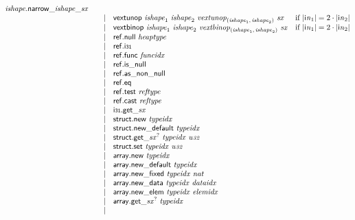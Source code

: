 $$\begin{array}{@{}lrrl@{}l@{}}
{{{{{\mathit{ishape}}.\mathsf{narrow}}{\mathsf{\_}}}{{\mathit{ishape}}}}{\mathsf{\_}}}{{\mathit{sx}}} \\ &&|&
\mathsf{vextunop}~{\mathit{ishape}}_{{1}}~{\mathit{ishape}}_{{2}}~{{\mathit{vextunop}}}_{({\mathit{ishape}}_{{1}},\, {\mathit{ishape}}_{{2}})}~{\mathit{sx}} &\quad
  \mbox{if}~{|{{\mathsf{i}}{{\mathit{n}}}}_{{1}}|} = 2 \cdot {|{{\mathsf{i}}{{\mathit{n}}}}_{{2}}|} \\ &&|&
\mathsf{vextbinop}~{\mathit{ishape}}_{{1}}~{\mathit{ishape}}_{{2}}~{{\mathit{vextbinop}}}_{({\mathit{ishape}}_{{1}},\, {\mathit{ishape}}_{{2}})}~{\mathit{sx}} &\quad
  \mbox{if}~{|{{\mathsf{i}}{{\mathit{n}}}}_{{1}}|} = 2 \cdot {|{{\mathsf{i}}{{\mathit{n}}}}_{{2}}|} \\ &&|&
\mathsf{ref.null}~{\mathit{heaptype}} \\ &&|&
\mathsf{ref.i{\scriptstyle31}} \\ &&|&
\mathsf{ref.func}~{\mathit{funcidx}} \\ &&|&
\mathsf{ref.is\_null} \\ &&|&
\mathsf{ref.as\_non\_null} \\ &&|&
\mathsf{ref.eq} \\ &&|&
\mathsf{ref.test}~{\mathit{reftype}} \\ &&|&
\mathsf{ref.cast}~{\mathit{reftype}} \\ &&|&
{{\mathsf{i{\scriptstyle31}.get}}{\mathsf{\_}}}{{\mathit{sx}}} \\ &&|&
\mathsf{struct.new}~{\mathit{typeidx}} \\ &&|&
\mathsf{struct.new\_default}~{\mathit{typeidx}} \\ &&|&
{{\mathsf{struct.get}}{\mathsf{\_}}}{{{\mathit{sx}}^?}}~{\mathit{typeidx}}~{\mathit{u{\scriptstyle32}}} \\ &&|&
\mathsf{struct.set}~{\mathit{typeidx}}~{\mathit{u{\scriptstyle32}}} \\ &&|&
\mathsf{array.new}~{\mathit{typeidx}} \\ &&|&
\mathsf{array.new\_default}~{\mathit{typeidx}} \\ &&|&
\mathsf{array.new\_fixed}~{\mathit{typeidx}}~{\mathit{nat}} \\ &&|&
\mathsf{array.new\_data}~{\mathit{typeidx}}~{\mathit{dataidx}} \\ &&|&
\mathsf{array.new\_elem}~{\mathit{typeidx}}~{\mathit{elemidx}} \\ &&|&
{{\mathsf{array.get}}{\mathsf{\_}}}{{{\mathit{sx}}^?}}~{\mathit{typeidx}} \\ &&|&

\end{array}$$
